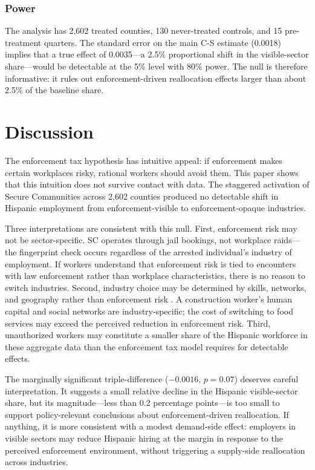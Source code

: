 \documentclass[12pt]{article}
\begin{document}


\subsubsection*{Power} The analysis has 2,602 treated counties, 130 never-treated controls, and 15 pre-treatment quarters. The standard error on the main C-S estimate (0.0018) implies that a true effect of 0.0035---a 2.5\% proportional shift in the visible-sector share---would be detectable at the 5\% level with 80\% power. The null is therefore informative: it rules out enforcement-driven reallocation effects larger than about 2.5\% of the baseline share.


\section{Discussion}
\label{sec:discussion}

The enforcement tax hypothesis has intuitive appeal: if enforcement makes certain workplaces risky, rational workers should avoid them. This paper shows that this intuition does not survive contact with data. The staggered activation of Secure Communities across 2,602 counties produced no detectable shift in Hispanic employment from enforcement-visible to enforcement-opaque industries.

Three interpretations are consistent with this null. First, enforcement risk may not be sector-specific. SC operates through jail bookings, not workplace raids---the fingerprint check occurs regardless of the arrested individual's industry of employment. If workers understand that enforcement risk is tied to encounters with law enforcement rather than workplace characteristics, there is no reason to switch industries. Second, industry choice may be determined by skills, networks, and geography rather than enforcement risk \citep{peri2012effect}. A construction worker's human capital and social networks are industry-specific; the cost of switching to food services may exceed the perceived reduction in enforcement risk. Third, unauthorized workers may constitute a smaller share of the Hispanic workforce in these aggregate data than the enforcement tax model requires for detectable effects.

The marginally significant triple-difference ($-0.0016$, $p = 0.07$) deserves careful interpretation. It suggests a small relative decline in the Hispanic visible-sector share, but its magnitude---less than 0.2 percentage points---is too small to support policy-relevant conclusions about enforcement-driven reallocation. If anything, it is more consistent with a modest demand-side effect: employers in visible sectors may reduce Hispanic hiring at the margin in response to the perceived enforcement environment, without triggering a supply-side reallocation across industries.
\end{document}
